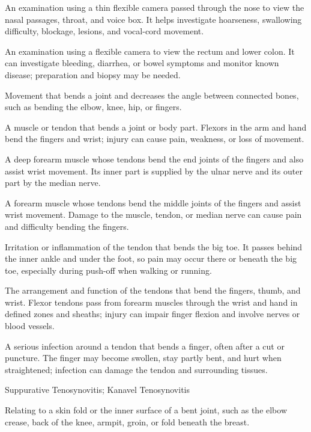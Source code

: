 An examination using a thin flexible camera passed through the nose to view the nasal passages, throat, and voice box. It helps investigate hoarseness, swallowing difficulty, blockage, lesions, and vocal-cord movement.

 An examination using a flexible camera to view the rectum and lower colon. It can investigate bleeding, diarrhea, or bowel symptoms and monitor known disease; preparation and biopsy may be needed.

 Movement that bends a joint and decreases the angle between connected bones, such as bending the elbow, knee, hip, or fingers.

 A muscle or tendon that bends a joint or body part. Flexors in the arm and hand bend the fingers and wrist; injury can cause pain, weakness, or loss of movement.

 A deep forearm muscle whose tendons bend the end joints of the fingers and also assist wrist movement. Its inner part is supplied by the ulnar nerve and its outer part by the median nerve.

 A forearm muscle whose tendons bend the middle joints of the fingers and assist wrist movement. Damage to the muscle, tendon, or median nerve can cause pain and difficulty bending the fingers.

 Irritation or inflammation of the tendon that bends the big toe. It passes behind the inner ankle and under the foot, so pain may occur there or beneath the big toe, especially during push-off when walking or running.

 The arrangement and function of the tendons that bend the fingers, thumb, and wrist. Flexor tendons pass from forearm muscles through the wrist and hand in defined zones and sheaths; injury can impair finger flexion and involve nerves or blood vessels.

 A serious infection around a tendon that bends a finger, often after a cut or puncture. The finger may become swollen, stay partly bent, and hurt when straightened; infection can damage the tendon and surrounding tissues.

\synonyms
Suppurative Tenosynovitis; Kanavel Tenosynovitis

 Relating to a skin fold or the inner surface of a bent joint, such as the elbow crease, back of the knee, armpit, groin, or fold beneath the breast.

